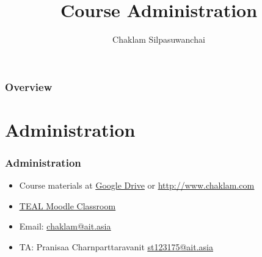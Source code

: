 \documentclass{beamer}
\title[Course Administration]{Course Administration} %
\author{Chaklam Silpasuwanchai} %
\institute[AIT] %
{
Asian Institute of Technology \\ %
\medskip
\textit{chaklam@ait.asia} %
}
\date{} %
\begin{document}
\begin{frame}
\titlepage %
\end{frame}

\begin{frame}
\frametitle{Overview} %
\tableofcontents %
\end{frame}



\section{Administration} %

\begin{frame}
\frametitle{Administration}
\begin{itemize}
	\item Course materials at \underline{\href{https://drive.google.com/drive/folders/1cHWrCKnRc1_xkWr_IgW4X-iBqm1hsnhP?usp=sharing}{Google Drive}} or \underline{\url{http://www.chaklam.com}}
	\item \underline{\href{https://teal2o.cs.ait.ac.th}{TEAL Moodle Classroom}}
	\item Email: \underline{\href{mailto:chaklam@ait.asia}{chaklam@ait.asia}} 
    \item TA: Pranisaa Charnparttaravanit \underline{\href{mailto:st123175@ait.asia}{st123175@ait.asia}} 
\end{itemize}
\vspace{0.2cm}
\end{frame}
\end{document}
